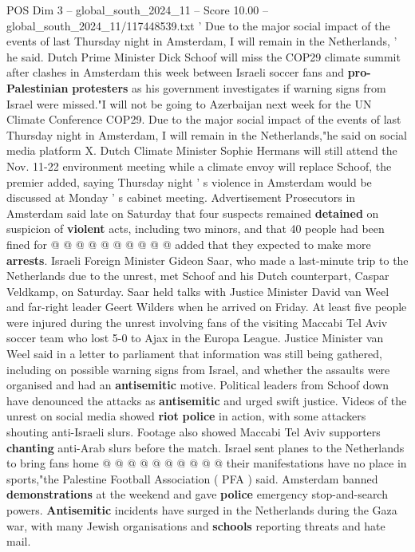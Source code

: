 \begin{textsample}{POS Dim 3 – global\_south\_2024\_11 – Score 10.00 – global\_south\_2024\_11/117448539.txt}  \label{ex:f3_pos_322}
' Due to the major social impact of the events of last Thursday night in Amsterdam, I will remain in the Netherlands, ' he said.
Dutch Prime Minister Dick Schoof will miss the COP29 climate summit after clashes in Amsterdam this week between Israeli soccer fans and \textbf{pro-Palestinian} \textbf{protesters} as his government investigates if warning signs from Israel were missed."I will not be going to Azerbaijan next week for the UN Climate Conference COP29.
Due to the major social impact of the events of last Thursday night in Amsterdam, I will remain in the Netherlands,"he said on social media platform X.
Dutch Climate Minister Sophie Hermans will still attend the Nov. 11-22 environment meeting while a climate envoy will replace Schoof, the premier added, saying Thursday night ' s violence in Amsterdam would be discussed at Monday ' s cabinet meeting.
Advertisement Prosecutors in Amsterdam said late on Saturday that four suspects remained \textbf{detained} on suspicion of \textbf{violent} acts, including two minors, and that 40 people had been fined for @ @ @ @ @ @ @ @ @ @ added that they expected to make more \textbf{arrests}.
Israeli Foreign Minister Gideon Saar, who made a last-minute trip to the Netherlands due to the unrest, met Schoof and his Dutch counterpart, Caspar Veldkamp, on Saturday.
Saar held talks with Justice Minister David van Weel and far-right leader Geert Wilders when he arrived on Friday.
At least five people were injured during the unrest involving fans of the visiting Maccabi Tel Aviv soccer team who lost 5-0 to Ajax in the Europa League.
Justice Minister van Weel said in a letter to parliament that information was still being gathered, including on possible warning signs from Israel, and whether the assaults were organised and had an \textbf{antisemitic} motive.
Political leaders from Schoof down have denounced the attacks as \textbf{antisemitic} and urged swift justice.
Videos of the unrest on social media showed \textbf{riot} \textbf{police} in action, with some attackers shouting anti-Israeli slurs.
Footage also showed Maccabi Tel Aviv supporters \textbf{chanting} anti-Arab slurs before the match.
Israel sent planes to the Netherlands to bring fans home @ @ @ @ @ @ @ @ @ @ their manifestations have no place in sports,"the Palestine Football Association ( PFA ) said.
Amsterdam banned \textbf{demonstrations} at the weekend and gave \textbf{police} emergency stop-and-search powers. \textbf{Antisemitic} incidents have surged in the Netherlands during the Gaza war, with many Jewish organisations and \textbf{schools} reporting threats and hate mail.

\end{textsample}
